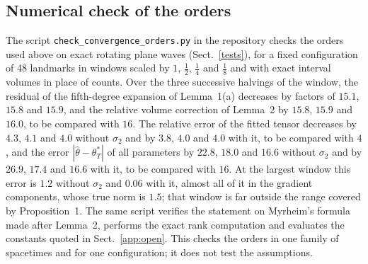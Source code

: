 \subsection{Numerical check of the orders}\label{app:check}
The script \texttt{check\_convergence\_orders.py} in the repository checks
the orders used above on exact rotating plane waves
(Sect.~\ref{tests}), for a fixed configuration of 48 landmarks in windows
scaled by $1$, $\tfrac12$, $\tfrac14$ and $\tfrac18$ and with exact
interval volumes in place of counts. Over the three successive halvings of
the window, the residual of the fifth-degree expansion of Lemma~1(a)
decreases by factors of $15.1$, $15.8$ and $15.9$, and the relative volume
correction of Lemma~2 by $15.8$, $15.9$ and $16.0$, to be compared with
$16$. The relative error of the fitted tensor decreases by $4.3$, $4.1$
and $4.0$ without $\sigma_2$ and by $3.8$, $4.0$ and $4.0$ with it, to be
compared with $4$, and the error $|\hat\theta-\theta^*_T|$ of all
parameters by $22.8$, $18.0$ and $16.6$ without $\sigma_2$ and by $26.9$,
$17.4$ and $16.6$ with it, to be compared with $16$. At the largest window
this error is $1.2$ without $\sigma_2$ and $0.06$ with it, almost all of it
in the gradient components, whose true norm is $1.5$; that window is far
outside the range covered by Proposition~1. The same script verifies the
statement on Myrheim's formula made after Lemma~2, performs the exact rank
computation and evaluates the constants quoted in Sect.~\ref{app:open}.
This checks the orders in one family of spacetimes and for one
configuration; it does not test the assumptions.
